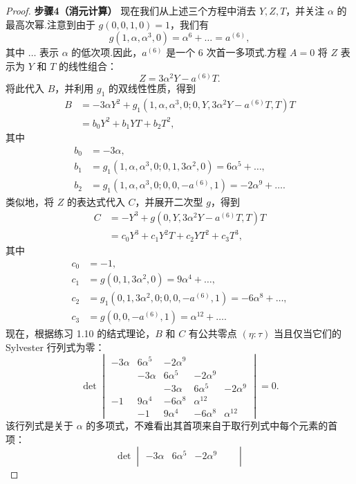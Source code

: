 \begin{proof}
\textbf{步骤4（消元计算）} 现在我们从上述三个方程中消去 \(Y,Z,T\)，并关注 \(\alpha\) 的最高次幂.注意到由于 \(g(0,0,1,0)=1\)，我们有
\[
g(1, \alpha, \alpha^3, 0) = \alpha^6 + \dots = a^{(6)},
\]
其中 \(\dots\) 表示 \(\alpha\) 的低次项.因此，\(a^{(6)}\) 是一个 6 次首一多项式.方程 \(A=0\) 将 \(Z\) 表示为 \(Y\) 和 \(T\) 的线性组合：
\[
Z = 3\alpha^2 Y - a^{(6)}T.
\]
将此代入 \(B\)，并利用 \(g_1\) 的双线性性质，得到
\begin{align*}
B &= -3\alpha Y^2 + g_1(1, \alpha, \alpha^3, 0; 0, Y, 3\alpha^2 Y - a^{(6)}T, T)T \\
  &= b_0 Y^2 + b_1 YT + b_2 T^2,
\end{align*}
其中
\begin{align*}
b_0 &= -3\alpha, \\
b_1 &= g_1(1, \alpha, \alpha^3, 0; 0, 1, 3\alpha^2, 0) = 6\alpha^5 + \dots, \\
b_2 &= g_1(1, \alpha, \alpha^3, 0; 0, 0, -a^{(6)}, 1) = -2\alpha^9 + \dots.
\end{align*}
类似地，将 \(Z\) 的表达式代入 \(C\)，并展开二次型 \(g\)，得到
\begin{align*}
C &= -Y^3 + g(0, Y, 3\alpha^2 Y - a^{(6)}T, T)T \\
  &= c_0 Y^3 + c_1 Y^2T + c_2 YT^2 + c_3 T^3,
\end{align*}
其中
\begin{align*}
c_0 &= -1, \\
c_1 &= g(0, 1, 3\alpha^2, 0) = 9\alpha^4 + \dots, \\
c_2 &= g_1(0, 1, 3\alpha^2, 0; 0, 0, -a^{(6)}, 1) = -6\alpha^8 + \dots, \\
c_3 &= g(0, 0, -a^{(6)}, 1) = \alpha^{12} + \dots.
\end{align*}
现在，根据练习 1.10 的结式理论，\(B\) 和 \(C\) 有公共零点 \((\eta:\tau)\) 当且仅当它们的 Sylvester 行列式为零：
\[
\det \begin{vmatrix}
-3\alpha & 6\alpha^5 & -2\alpha^9 & & \\
& -3\alpha & 6\alpha^5 & -2\alpha^9 & \\
& & -3\alpha & 6\alpha^5 & -2\alpha^9 \\
-1 & 9\alpha^4 & -6\alpha^8 & \alpha^{12} & \\
& -1 & 9\alpha^4 & -6\alpha^8 & \alpha^{12}
\end{vmatrix} = 0.
\]
该行列式是关于 \(\alpha\) 的多项式，不难看出其首项来自于取行列式中每个元素的首项：
\[
\det \begin{vmatrix}
-3\alpha & 6\alpha^5 & -2\alpha^9 & & \\

\end{vmatrix}\]
\end{proof}
